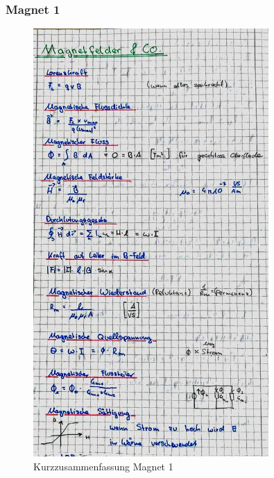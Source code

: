 \documentclass[12pt,a4paper]{article}%
\numberwithin{equation}{section}
\numberwithin{equation}{subsection}
\begin{document}
  \subsubsection{Magnet 1}
\begin{figure}[H] 
	  \centering
	  \includegraphics[width=0.8\textwidth]{3_Magnet_1.jpg}
	  \caption{Kurzzusammenfassung Magnet 1}
	  \label{fig:magnet_1}
  \end{figure}
  \newpage
\end{document}
